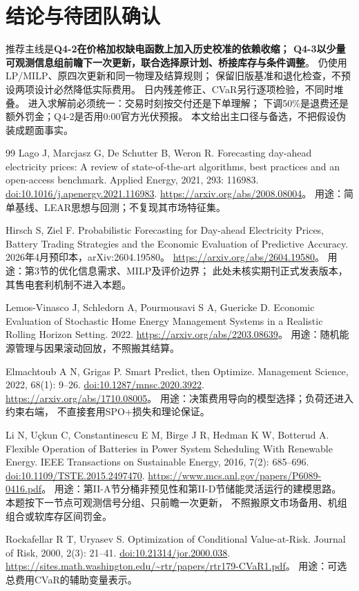 \documentclass[UTF8,11pt]{ctexart}
\begin{document}
\section{结论与待团队确认}
推荐主线是\textbf{Q4-2在价格加权缺电函数上加入历史校准的依赖收缩；
Q4-3以少量可观测信息组前瞻下一次更新，联合选择原计划、桥接库存与条件调整}。
仍使用LP/MILP、原四次更新和同一物理及结算规则；
保留旧版基准和退化检查，不预设两项设计必然降低实际费用。
日内残差修正、CVaR另行逐项检验，不同时堆叠。
进入求解前必须统一：交易时刻按交付还是下单理解；
下调50\%是退费还是额外罚金；Q4-2是否用0:00官方光伏预报。
本文给出主口径与备选，不把假设伪装成题面事实。

\begingroup
\small
\begin{thebibliography}{99}
Lago J, Marcjasz G, De Schutter B, Weron R.
Forecasting day-ahead electricity prices: A review of state-of-the-art algorithms,
best practices and an open-access benchmark.
Applied Energy, 2021, 293: 116983.
\href{https://doi.org/10.1016/j.apenergy.2021.116983}{doi:10.1016/j.apenergy.2021.116983}.
\url{https://arxiv.org/abs/2008.08004}。
用途：简单基线、LEAR思想与回测；不复现其市场特征集。

Hirsch S, Ziel F.
Probabilistic Forecasting for Day-ahead Electricity Prices, Battery Trading
Strategies and the Economic Evaluation of Predictive Accuracy.
2026年4月预印本，arXiv:2604.19580。
\url{https://arxiv.org/abs/2604.19580}。
用途：第3节的优化信息需求、MILP及评价边界；
此处未核实期刊正式发表版本，其售电套利机制不进入本题。

Lemos-Vinasco J, Schledorn A, Pourmousavi S A, Guericke D.
Economic Evaluation of Stochastic Home Energy Management Systems in a
Realistic Rolling Horizon Setting. 2022.
\url{https://arxiv.org/abs/2203.08639}。
用途：随机能源管理与因果滚动回放，不照搬其结算。

Elmachtoub A N, Grigas P.
Smart Predict, then Optimize.
Management Science, 2022, 68(1): 9--26.
\href{https://doi.org/10.1287/mnsc.2020.3922}{doi:10.1287/mnsc.2020.3922}.
\url{https://arxiv.org/abs/1710.08005}。
用途：决策费用导向的模型选择；负荷还进入约束右端，
不直接套用SPO+损失和理论保证。

Li N, Uçkun C, Constantinescu E M, Birge J R, Hedman K W, Botterud A.
Flexible Operation of Batteries in Power System Scheduling With Renewable Energy.
IEEE Transactions on Sustainable Energy, 2016, 7(2): 685--696.
\href{https://doi.org/10.1109/TSTE.2015.2497470}{doi:10.1109/TSTE.2015.2497470}.
\url{https://www.mcs.anl.gov/papers/P6089-0416.pdf}。
用途：第II-A节分桶非预见性和第II-D节储能灵活运行的建模思路。
本题按下一节点可观测信号分组、只前瞻一次更新，
不照搬原文市场备用、机组组合或软库存区间罚金。

Rockafellar R T, Uryasev S.
Optimization of Conditional Value-at-Risk.
Journal of Risk, 2000, 2(3): 21--41.
\href{https://doi.org/10.21314/jor.2000.038}{doi:10.21314/jor.2000.038}.
\url{https://sites.math.washington.edu/~rtr/papers/rtr179-CVaR1.pdf}。
用途：可选总费用CVaR的辅助变量表示。
\end{thebibliography}
\endgroup
\end{document}

